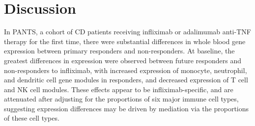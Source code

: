 


\section{Discussion}

In \gls{PANTS}, a cohort of \gls{CD} patients receiving infliximab or adalimumab anti-\gls{TNF} therapy for the first time,
there were substantial differences in whole blood gene expression between primary responders and non-responders.
At baseline, the greatest differences in expression were observed between future responders and non-responders to infliximab,
with increased expression of monocyte, neutrophil, and dendritic cell gene modules in responders,
and decreased expression of T cell and \gls{NK} cell modules.
These effects appear to be infliximab-specific, and are attenuated after adjusting for the proportions of six major immune cell types,
suggesting expression differences may be driven by mediation via the proportions of these cell types.

